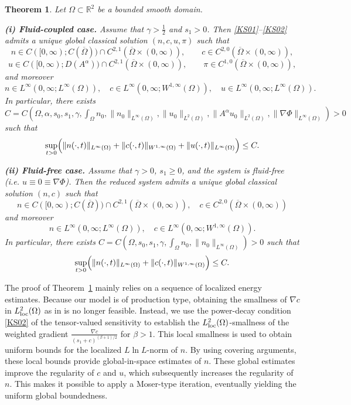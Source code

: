 \documentclass{amsart}
\newtheorem{theorem}[defn]{Theorem}
\numberwithin{equation}{section}
\newcommand{\R}{{ \mathbb{R}  }}
\begin{document}
\begin{theorem}\label{THM1}
Let $\Omega\subset\R^2$ be a bounded smooth domain.

\smallskip
\noindent\textbf{(i) Fluid-coupled case.}
Assume that $\gamma>\frac12$ and $s_1>0$.
Then \eqref{KS01}--\eqref{KS02} admits a unique global classical solution $(n,c,u,\pi)$ such that
\[
n\in C([0,\infty);C(\overline{\Omega}))\cap C^{2,1}(\overline{\Omega}\times(0,\infty)),
\qquad
c\in C^{2,0}(\overline{\Omega}\times(0,\infty)),
\]
\[
u\in C([0,\infty);D(A^\alpha))\cap C^{2,1}(\overline{\Omega}\times(0,\infty)),
\qquad
\pi\in C^{1,0}(\overline{\Omega}\times(0,\infty)),
\]
and moreover
\[
n\in L^\infty(0,\infty;L^\infty(\Omega)),\quad
c\in L^\infty(0,\infty;W^{1,\infty}(\Omega)),\quad
u\in L^\infty(0,\infty;L^\infty(\Omega)).
\]
In particular, there exists $C=C (\Omega,\alpha,s_0,s_1,\gamma,\int_\Omega n_0, \|n_0\|_{L^{\infty}(\Omega)},\|u_0\|_{L^2(\Omega)},\|A^\alpha u_0\|_{L^2(\Omega)},\|\nabla\Phi\|_{L^\infty(\Omega)} )>0$
such that
\[
\sup_{t>0}\Bigl(\|n(\cdot,t)\|_{L^\infty(\Omega)}+\|c(\cdot,t)\|_{W^{1,\infty}(\Omega)}+\|u(\cdot,t)\|_{L^\infty(\Omega)}\Bigr)\le C.
\]

\smallskip
\noindent\textbf{(ii) Fluid-free case.}
Assume that $\gamma>0$, $s_1\ge0$, and the system is fluid-free (i.e. $u\equiv 0 \equiv \nabla \Phi$).
Then the reduced system admits a unique global classical solution $(n,c)$ such that
\[
n\in C([0,\infty);C(\overline{\Omega}))\cap C^{2,1}(\overline{\Omega}\times(0,\infty)), \quad c\in C^{2,0}(\overline{\Omega}\times(0,\infty))
\]
and moreover
\[
n\in L^\infty(0,\infty;L^\infty(\Omega)), \quad 
c\in L^\infty(0,\infty;W^{1,\infty}(\Omega)).
\]
In particular, there exists $C=C (\Omega,s_0,s_1,\gamma,\int_\Omega n_0, \|n_0\|_{L^{\infty}(\Omega)} )>0$
such that
\[
\sup_{t>0}\Bigl(\|n(\cdot,t)\|_{L^\infty(\Omega)}+\|c(\cdot,t)\|_{W^{1,\infty}(\Omega)}\Bigr)\le C.
\]
\end{theorem}


The proof of Theorem~\ref{THM1} mainly relies on a sequence of localized energy estimates. Because our model is of production type, obtaining the smallness of $\nabla c$ in $L^2_{\rm loc}(\Omega)$ as in \cite{Ahn_Kang_Lee_2023} is no longer feasible. Instead, we use the power-decay condition \eqref{KS02} of the tensor-valued sensitivity to establish the $L^{2}_{\rm loc}(\Omega)$-smallness of the weighted gradient $\frac{\nabla c}{(s_1 + c)^{(\beta+1)/2}}$ for $\beta>1$. 
This local smallness is used to obtain uniform bounds for the localized $L \ln L$-norm of $n$. By using covering arguments, these local bounds provide global-in-space estimates of $n$. These global estimates improve the regularity of $c$ and $u$, which subsequently increases the regularity of $n$. This makes it possible to apply a Moser-type iteration, eventually yielding the uniform global boundedness.
\end{document}
